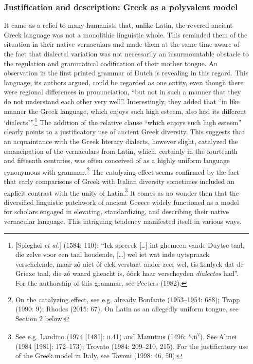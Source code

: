 \subsubsection{Justification and description: Greek as a polyvalent model}
\hypertarget{Toc19704860}{}\begin{styleStandard}
It came as a relief to many humanists that, unlike Latin, the revered ancient Greek language was not a monolithic linguistic whole. This reminded them of the situation in their native vernaculars and made them at the same time aware of the fact that dialectal variation was not necessarily an insurmountable obstacle to the regulation and grammatical codification of their mother tongue. An observation in the first printed grammar of Dutch is revealing in this regard. This language, its authors argued, could be regarded as one entity, even though there were regional differences in pronunciation, “but not in such a manner that they do not understand each other very well”. Interestingly, they added that “in like manner the Greek language, which enjoys such high esteem, also had its different ‘dialects’”.\footnote{ [Spieghel \textit{et al.}] (1584: 110): “Ick spreeck […] int ghemeen vande Duytse taal, die zelve voor een taal houdende, […] wel iet wat inde uytspraack verschelende, maar zó niet óf elck verstaat ander zeer wel, tis kenlyck dat de Griexe taal, die zó waard gheacht is, óóck haar verscheyden \textit{dialectos} had”. For the authorship of this grammar, see Peeters (1982).} The addition of the relative clause “which enjoys such high esteem” clearly points to a justificatory use of ancient Greek diversity. This suggests that an acquaintance with the Greek literary dialects, however slight, catalyzed the emancipation of the vernaculars from Latin, which, certainly in the fourteenth and fifteenth centuries, was often conceived of as a highly uniform language synonymous with grammar.\footnote{ On the catalyzing effect, see e.g. already Bonfante (1953–1954: 688); Trapp (1990: 9); Rhodes (2015: 67). On Latin as an allegedly uniform tongue, see\textit{ }Section 2 below.} The catalyzing effect seems confirmed by the fact that early comparisons of Greek with Italian diversity sometimes included an explicit contrast with the unity of Latin.\footnote{ See e.g. Landino (1974 [1481]: \textsc{ii}.41) and Manutius (1496: *.ii\textsc{\textsuperscript{v}}). See Alinei (1984 [1981]: 172–173); Trovato (1984: 209–210, 215). For the justificatory use of the Greek model in Italy, see Tavoni (1998: 46, 50).} It comes as no wonder then that the diversified linguistic patchwork of ancient Greece widely functioned as a model for scholars engaged in elevating, standardizing, and describing their native vernacular language. This intriguing tendency manifested itself in various ways.
\end{styleStandard}

